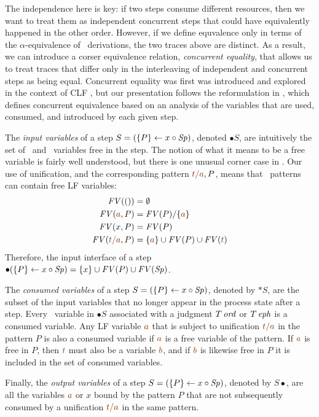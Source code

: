 The independence here is key: if two steps consume different
resources, then we want to treat them as independent concurrent steps
that could have equivalently happened in the other order. However, if
we define equvalence only in terms of the $\alpha$-equivalence of
\ollll~derivations, the two traces above are distinct. As a result, we
can introduce a corser equivalence relation, {\it concurrent
  equality}, that allows us to treat traces that differ only in the
interleaving of independent and concurrent steps as being equal.
Concurrent equality was first was introduced and explored in the
context of CLF \cite{watkins02concurrent}, but our presentation
follows the reformulation in \cite{cervesato12trace}, which defines
concurrent equivalence based on an analysis of the variables that 
are used, consumed, and introduced by each given step.

The {\it input variables} of a step $S = (\{{P}\} \leftarrow {x} \circ {{\it Sp}})$, denoted
${\bullet}S$, are intuitively the set of \lf~and \sls~variables free in
the step. The notion of what it means to be a free variable is fairly
well understood, but there is one unusual corner case in \sls. Our use
of unification, and the corresponding pattern $\lf{t/a}, P$, means
that \sls~patterns can contain free LF variables:
\begin{align*}
{\it FV}(()) & = \emptyset
\\
{\it FV}(\lf{a}, P) & = {\it FV}(P)/\{\lf{a}\} 
\\
{\it FV}(x, P) & = {\it FV}(P)
\\
{\it FV}(\lf{t/a}, P) & =  \{ \lf{a} \} \cup {\it FV}(P) \cup {\it FV}(\lf{t}) 
\end{align*}
Therefore, the input interface of a step ${\bullet}(\{{P}\} \leftarrow {x} \circ {{\it Sp}})
= \{ x \} \cup {\it FV}(P) \cup {\it FV}({\it Sp})$.

The {\it consumed variables} of a step $S = (\{{P}\} \leftarrow {x} \circ {{\it Sp}})$,
denoted by ${\ast}S$, are the subset of the input variables that no
longer appear in the process state after a step. Every \sls~variable
in ${\bullet}S$ associated with a judgment ${T}\,{{\it ord}}$ or ${T}\,{{\it eph}}$
is a consumed variable. Any LF variable $\lf{a}$ that is subject to
unification $\lf{t/a}$ in the pattern $P$ is also a consumed variable
if $\lf{a}$ is a free variable of the pattern. If $\lf{a}$ is free in
$P$, then $\lf{t}$ must also be a variable $\lf{b}$, and if $\lf{b}$
is likewise free in $P$ it is included in the set of consumed
variables.

Finally, the {\it output variables} of a step $S = (\{{P}\} \leftarrow {x} \circ {{\it Sp}})$,
denoted by $S{\bullet}$, are all the variables $\lf{a}$ or $x$ bound by
the pattern $P$ that are not subsequently consumed by a unification
$\lf{t/a}$ in the same pattern. 

